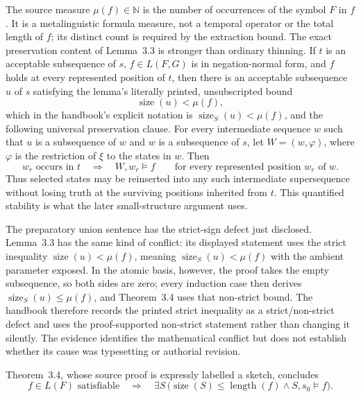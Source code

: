 The source measure \(\mu(f)\in\mathbb N\) is the number of occurrences of the
symbol \(F\) in \(f\).  It is a metalinguistic formula measure, not a temporal
operator or the total length of \(f\); its distinct count is required by the
extraction bound.  The exact preservation content of Lemma~3.3 is stronger
than ordinary thinning.  If \(t\) is an acceptable subsequence of \(s\),
\(f\in L(F,G)\) is in negation-normal form, and \(f\) holds at every
represented position of \(t\), then there is an acceptable subsequence \(u\)
of \(s\) satisfying the lemma's literally printed, unsubscripted bound
\[
 \operatorname{size}(u)<\mu(f),
\]
which in the handbook's explicit notation is
\(\operatorname{size}_{S}(u)<\mu(f)\),
and the following universal preservation clause.  For every intermediate
sequence \(w\) such that \(u\) is a subsequence of \(w\) and \(w\) is a
subsequence of \(s\), let \(W=(w,\varphi)\), where \(\varphi\) is the
restriction of \(\xi\) to the states in \(w\).  Then
\[
 w_r\text{ occurs in }t\quad\Longrightarrow\quad W,w_r\models f
 \qquad\text{for every represented position }w_r\text{ of }w.
\]
Thus selected states may be reinserted into any such intermediate
supersequence without losing truth at the surviving positions inherited from
\(t\).  This quantified stability is what the later small-structure argument
uses.

The preparatory union sentence has the strict-sign defect just disclosed.
Lemma~3.3 has the same kind of conflict: its displayed statement uses the
strict inequality \(\operatorname{size}(u)<\mu(f)\), meaning
\(\operatorname{size}_{S}(u)<\mu(f)\) with the ambient parameter exposed.
In the atomic basis, however, the proof takes the empty
subsequence, so both sides are zero; every induction case then derives
\(\operatorname{size}_{S}(u)\le\mu(f)\), and Theorem~3.4 uses that non-strict
bound.  The handbook therefore records the printed strict inequality as a
strict/non-strict defect and uses the proof-supported non-strict statement
rather than changing it silently.  The evidence identifies the mathematical
conflict but does not establish whether its cause was typesetting or authorial
revision.

Theorem~3.4, whose source proof is expressly labelled
a sketch, concludes
\[
 f\in L(F)\text{ satisfiable}
 \quad\Longrightarrow\quad
 \exists S\,
 \bigl(\operatorname{size}(S)\le\operatorname{length}(f)
       \land S,s_0\models f\bigr).
\]

